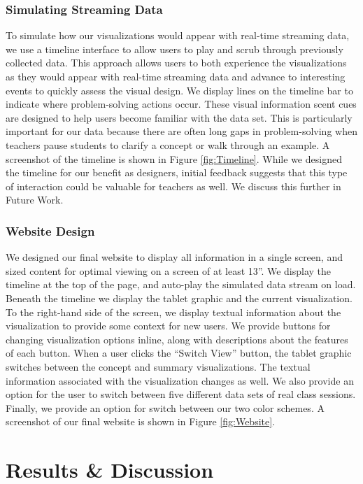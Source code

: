 \documentclass{sigchi}
\begin{document}
\subsubsection{Simulating Streaming Data}
To simulate how our visualizations would appear with real-time streaming data, we use a timeline interface to allow users to play and scrub through previously collected data. This approach allows users to both experience the visualizations as they would appear with real-time streaming data and advance to interesting events to quickly assess the visual design. We display lines on the timeline bar to indicate where problem-solving actions occur. These visual information scent cues \cite{Willett07} are designed to help users become familiar with the data set. This is particularly important for our data because there are often long gaps in problem-solving when teachers pause students to clarify a concept or walk through an example. A screenshot of the timeline is shown in Figure \ref{fig:Timeline}. While we designed the timeline for our benefit as designers, initial feedback suggests that this type of interaction could be valuable for teachers as well. We discuss this further in Future Work.

\subsubsection{Website Design}
We designed our final website to display all information in a single screen, and sized content for optimal viewing on a screen of at least 13''. We display the timeline at the top of the page, and auto-play the simulated data stream on load. Beneath the timeline we display the tablet graphic and the current visualization. To the right-hand side of the screen, we display textual information about the visualization to provide some context for new users. We provide buttons for changing visualization options inline, along with descriptions about the features of each button. When a user clicks the ``Switch View'' button, the tablet graphic switches between the concept and summary visualizations. The textual information associated with the visualization changes as well. We also provide an option for the user to switch between five different data sets of real class sessions. Finally, we provide an option for switch between our two color schemes.  A screenshot of our final website is shown in Figure \ref{fig:Website}. 



\section{Results \& Discussion}
\end{document}
